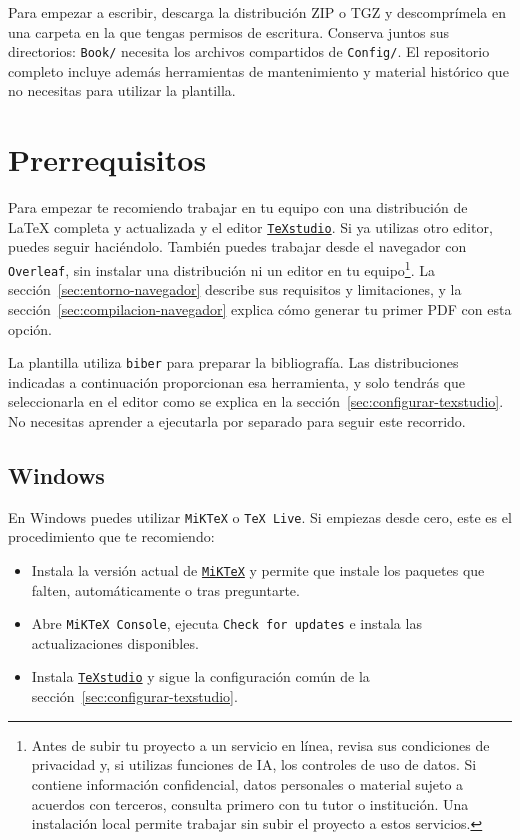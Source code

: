 Para empezar a escribir, descarga la distribución ZIP o TGZ y descomprímela en una carpeta en la que tengas permisos de escritura. Conserva juntos sus directorios: \texttt{Book/} necesita los archivos compartidos de \texttt{Config/}. El repositorio completo incluye además herramientas de mantenimiento y material histórico que no necesitas para utilizar la plantilla.

\section{Prerrequisitos}
\label{sec:prerrequisitos}

Para empezar te recomiendo trabajar en tu equipo con una distribución de \LaTeX{} completa y actualizada y el editor \href{https://www.texstudio.org/}{\texttt{TeXstudio}}. Si ya utilizas otro editor, puedes seguir haciéndolo. También puedes trabajar desde el navegador con \texttt{Overleaf}, sin instalar una distribución ni un editor en tu equipo\footnote{Antes de subir tu proyecto a un servicio en línea, revisa sus condiciones de privacidad y, si utilizas funciones de IA, los controles de uso de datos. Si contiene información confidencial, datos personales o material sujeto a acuerdos con terceros, consulta primero con tu tutor o institución. Una instalación local permite trabajar sin subir el proyecto a estos servicios.}. La sección~\ref{sec:entorno-navegador} describe sus requisitos y limitaciones, y la sección~\ref{sec:compilacion-navegador} explica cómo generar tu primer PDF con esta opción.

La plantilla utiliza \texttt{biber} para preparar la bibliografía. Las distribuciones indicadas a continuación proporcionan esa herramienta, y solo tendrás que seleccionarla en el editor como se explica en la sección~\ref{sec:configurar-texstudio}. No necesitas aprender a ejecutarla por separado para seguir este recorrido.

\subsection{Windows}

En Windows puedes utilizar \texttt{MiKTeX} o \texttt{TeX Live}. Si empiezas desde cero, este es el procedimiento que te recomiendo:

\begin{itemize}
  \item Instala la versión actual de \href{https://miktex.org/download}{\texttt{MiKTeX}} y permite que instale los paquetes que falten, automáticamente o tras preguntarte.
  \item Abre \texttt{MiKTeX Console}, ejecuta \texttt{Check for updates} e instala las actualizaciones disponibles.
  \item Instala \href{https://www.texstudio.org/}{\texttt{TeXstudio}} y sigue la configuración común de la sección~\ref{sec:configurar-texstudio}.
\end{itemize}

